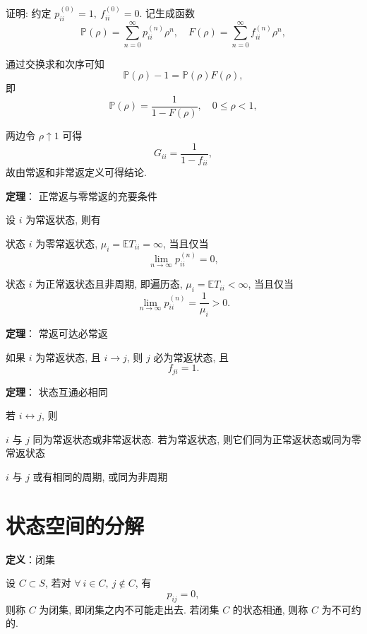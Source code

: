 \documentclass[openany]{ctexbook}
\theoremstyle{kaiti}
\theoremstyle{normal}
\begin{document}
证明: 约定 $p_{ii}^{(0)}=1,~f_{ii}^{(0)}=0$. 记生成函数
\begin{equation}
  \mathbb{P}(\rho)=\sum_{n=0}^\infty p_{ii}^{(n)}\rho^n,\quad F(\rho)=\sum_{n=0}^\infty f_{ii}^{(n)}\rho^n,
\end{equation}

通过交换求和次序可知
\begin{equation}
  \mathbb{P}(\rho)-1=\mathbb{P}(\rho)F(\rho),
\end{equation}
即
\begin{equation}
  \mathbb{P}(\rho)=\frac{1}{1-F(\rho)},\quad0\leqslant\rho<1,
\end{equation}

两边令 $\rho\uparrow1$ 可得
\begin{equation}
  G_{ii}=\frac{1}{1-f_{ii}},
\end{equation}
故由常返和非常返定义可得结论.

\textbf{定理}： 正常返与零常返的充要条件

设 $i$ 为常返状态, 则有

状态 $i$ 为零常返状态, $\mu_i=\mathbb{E}T_{ii}=\infty$, 当且仅当
\begin{equation}
  \lim_{n\to\infty} p_{ii}^{(n)}=0,
\end{equation}

状态 $i$ 为正常返状态且非周期, 即遍历态, $\mu_i=\mathbb{E}T_{ii}<\infty$, 当且仅当
\begin{equation}
  \lim_{n\to\infty} p_{ii}^{(n)}=\frac{1}{\mu_i}>0.
\end{equation}

\textbf{定理}： 常返可达必常返

如果 $i$ 为常返状态, 且 $i\to j$, 则 $j$ 必为常返状态, 且
\begin{equation}
  f_{ji}=1.
\end{equation}

\textbf{定理}： 状态互通必相同

若 $i\leftrightarrow j$, 则

$i$ 与 $j$ 同为常返状态或非常返状态. 若为常返状态, 则它们同为正常返状态或同为零常返状态

$i$ 与 $j$ 或有相同的周期, 或同为非周期

\section{状态空间的分解}

\textbf{定义}：闭集

设 $C\subset S$, 若对 $\forall~i\in C,~j\notin C$, 有
\begin{equation}
  p_{ij}=0,
\end{equation}
则称 $C$ 为闭集, 即闭集之内不可能走出去. 若闭集 $C$ 的状态相通, 则称 $C$ 为不可约的.
\end{document}
